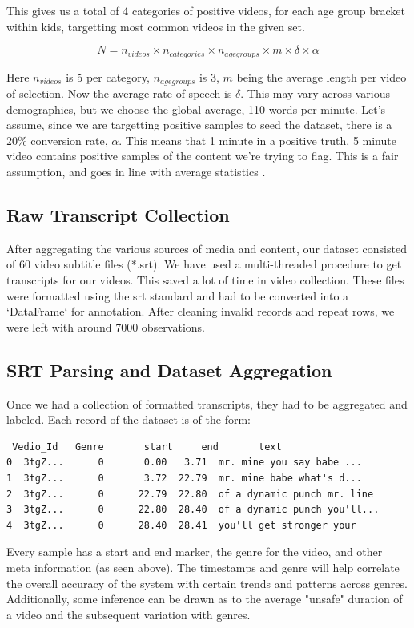 \documentclass{article}[A4]
\begin{document}
This gives us a total of 4 categories of positive videos, for each age group bracket within kids, targetting most common videos in the given set.

$$
N = n_{videos} \times n_{categories} \times n_{age groups} \times m \times \delta \times \alpha
$$

Here $n_{videos}$ is 5 per category, $n_{age groups}$ is 3, $m$ being the average length per video of selection. Now the average rate of speech
is $\delta$. This may vary across various demographics, but we choose the global average, 110 words per minute. Let's assume, since we are targetting
positive samples to seed the dataset, there is a 20\% conversion rate, $\alpha$. This means that 1 minute in a positive truth, 5 minute video contains
positive samples of the content we're trying to flag. This is a fair assumption, and goes in line with average statistics \citep{videostats}.

\subsection{Raw Transcript Collection}

After aggregating the various sources of media and content, our dataset consisted of 60 video subtitle files (*.srt). We have used a multi-threaded procedure to get transcripts for our videos. This saved a lot of time in video collection. These files were formatted using the srt standard and had to be converted into a `DataFrame` for annotation. After cleaning invalid records and repeat rows, we were left with around 7000 observations. 

\subsection{SRT Parsing and Dataset Aggregation}

Once we had a collection of formatted transcripts, they had to be aggregated and labeled. Each record of the dataset is of the form:
\begin{verbatim}
 Vedio_Id	Genre       start     end       text 
0  3tgZ...      0       0.00   3.71  mr. mine you say babe ...
1  3tgZ...      0       3.72  22.79  mr. mine babe what's d...
2  3tgZ...      0      22.79  22.80  of a dynamic punch mr. line 
3  3tgZ...      0      22.80  28.40  of a dynamic punch you'll... 
4  3tgZ...      0      28.40  28.41  you'll get stronger your 
\end{verbatim}

Every sample has a start and end marker, the genre for the video, and other meta information (as seen above). The timestamps and genre will help correlate the overall accuracy of the system with certain trends and patterns across genres. Additionally, some inference can be drawn as to the average "unsafe" duration of a video and the subsequent variation with genres. \\
\end{document}

